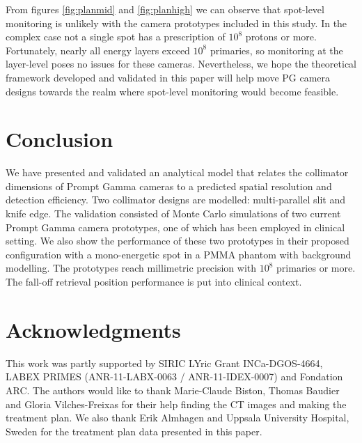 \documentclass[a4paper,english,12pt]{article}
\begin{document}
From figures \ref{fig:planmid} and \ref{fig:planhigh} we can observe that spot-level monitoring is unlikely with the camera prototypes included in this study. In the complex case not a single spot has a prescription of $10^8$ protons or more. Fortunately, nearly all energy layers exceed $10^8$ primaries, so monitoring at the layer-level poses no issues for these cameras. Nevertheless, we hope the theoretical framework developed and validated in this paper will help move PG camera designs towards the realm where spot-level monitoring would become feasible.

\section{Conclusion}

We have presented and validated an analytical model that relates the collimator dimensions of Prompt Gamma cameras to a predicted spatial resolution and detection efficiency. Two collimator designs are modelled: multi-parallel slit and knife edge. The validation consisted of Monte Carlo simulations of two current Prompt Gamma camera prototypes, one of which has been employed in clinical setting. We also show the performance of these two prototypes in their proposed configuration with a mono-energetic spot in a PMMA phantom with background modelling. The prototypes reach millimetric precision with $10^8$ primaries or more. The fall-off retrieval position performance is put into clinical context.

\section{Acknowledgments}

This work was partly supported by SIRIC LYric Grant INCa-DGOS-4664, LABEX PRIMES (ANR-11-LABX-0063 / ANR-11-IDEX-0007) and Fondation ARC. The authors would like to thank Marie-Claude Biston, Thomas Baudier and Gloria Vilches-Freixas for their help finding the CT images and making the treatment plan. We also thank Erik Almhagen and Uppsala University Hospital, Sweden for the treatment plan data presented in this paper.

\newpage

\appendix
%
\end{document}
